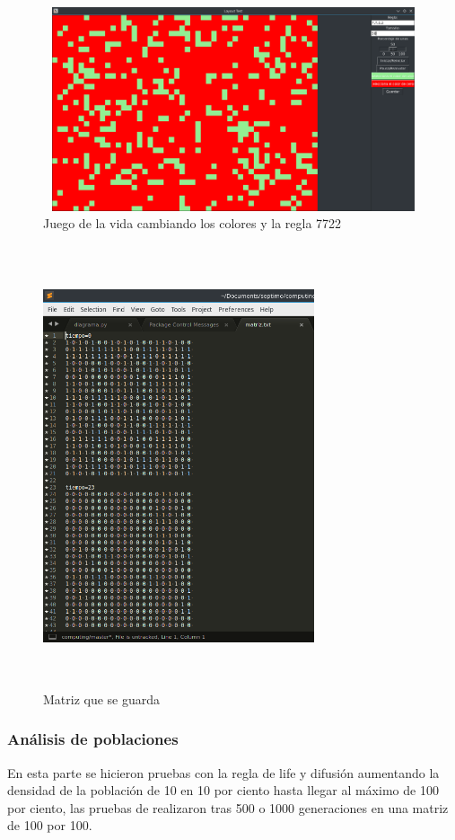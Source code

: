 \begin{figure}[H]
\begin{center}
 \includegraphics[width=13cm, height=6cm]{./img/gol_colores.png}
 \caption{Juego de la vida cambiando los colores y la regla 7722}
 \label{fig:gol_colores}
\end{center}
\end{figure}

\begin{figure}[H]
\begin{center}
 \includegraphics[width=8cm, height=13cm]{./img/matriz.png}
 \caption{Matriz que se guarda}
 \label{fig:matriz}
\end{center}
\end{figure}

\subsubsection{Análisis de poblaciones}
En esta parte se hicieron pruebas con la regla de life y difusión aumentando la densidad de la población de 10 en 10 por ciento hasta llegar al máximo de 100 por ciento, las pruebas de realizaron tras 500 o 1000 generaciones en una matriz de 100 por 100.



